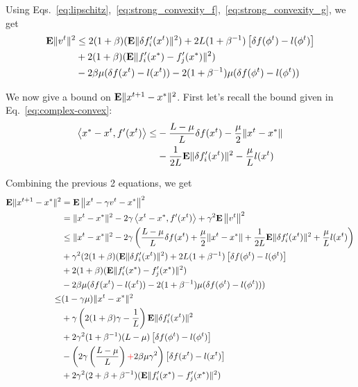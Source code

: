 \documentclass{article}
\newcommand{\E}{{\bf E}}
\newcommand{\highlight}[1]{\textcolor{red}{#1}}
\begin{document}
Using Eqs.~\ref{eq:lipschitz},~\ref{eq:strong_convexity_f},~\ref{eq:strong_convexity_g}, we get
\begin{align}
\nonumber
\E \| v^t \|^2 
& \leq 2 (1+\beta) ( \E\| \delta f'_i(x^t) \|^2) + 2L (1+\beta^{-1}) \left[ \delta f(\phi^t) - l (\phi^t) \right] \nonumber \\
& + 2 (1 + \beta) (\E \| f'_i(x^*) - f'_j(x^*)\|^2 ) \nonumber \\
&- 2 \beta \mu ( \delta f(x^t) - l(x^t)) - 2 (1+\beta^{-1}) \mu ( \delta f(\phi^t) - l(\phi^t))
\end{align}

We now give a bound on $\E \|x^{t+1}-x^*\|^2$. First let's recall the bound given in Eq.~\ref{eq:complex-convex}:
\begin{align}
\left\langle  x^*- x^t,  f'(x^t)  \right\rangle  \leq 
& - \frac{L-\mu}{L} \delta f(x^t) - \frac \mu 2 \| x^t - x^*\| 
\\ \nonumber & 
-\frac{1}{2L} \E \| \delta f_i'(x^t)\|^2 - \frac{\mu}{L} l(x^t)
\end{align}

Combining the previous 2 equations, we get
\begin{align}
\E \|x^{t+1}-x^*\|^2 & = \E \left\| x^t - \gamma v^t - x^* \right\|^2 
\\ \nonumber & = 
\| x^t -x^*\|^2  - 2 \gamma \left\langle  x^t - x^*,  f'(x^t)  \right\rangle 
+ \gamma^2 \E \left\| v^t \right\|^2
\\ \nonumber
&\leq \| x^t -x^*\|^2 - 2 \gamma \left(\frac{L-\mu}{L} \delta f(x^t) + \frac \mu 2 \| x^t - x^*\| + \frac{1}{2L} \E \| \delta f_i'(x^t)\|^2 + \frac{\mu}{L} l(x^t) \right)
\\ \nonumber
&+ \gamma^2 (
2 (1+\beta) ( \E\| \delta f'_i(x^t) \|^2) + 2L (1+\beta^{-1}) \left[ \delta f(\phi^t) - l (\phi^t) \right]
\\ \nonumber
& + 2 (1 + \beta) (\E \| f'_i(x^*) - f'_j(x^*)\|^2 )
\\ \nonumber
&- 2 \beta \mu ( \delta f(x^t) - l(x^t)) - 2 (1+\beta^{-1}) \mu ( \delta f(\phi^t) - l(\phi^t)) )
\\ \nonumber
\leq & (1-\gamma \mu) \| x^t - x^*\|^2
\\ \nonumber
& + \gamma \left( 2 (1+\beta) \gamma  - \frac{1}{L} \right) \E \| \delta f'_i(x^t) \|^2 
\\ \nonumber
& + 2\gamma^2 (1+\beta^{-1}) (L - \mu) \left[ \delta f(\phi^t) - l(\phi^t) \right]
\\ \nonumber
& - \left( 2 \gamma \left( \frac{L - \mu}{L} \right) \highlight{+} 2 \beta \mu \gamma^2 \right) \left[ \delta f(x^t)-  l(x^t) \right]
\\ \nonumber
& + 2 \gamma^2 (2 + \beta + \beta^{-1}) (\E \| f'_i(x^*) - f'_j(x^*)\|^2 )
\end{align}
\end{document}
